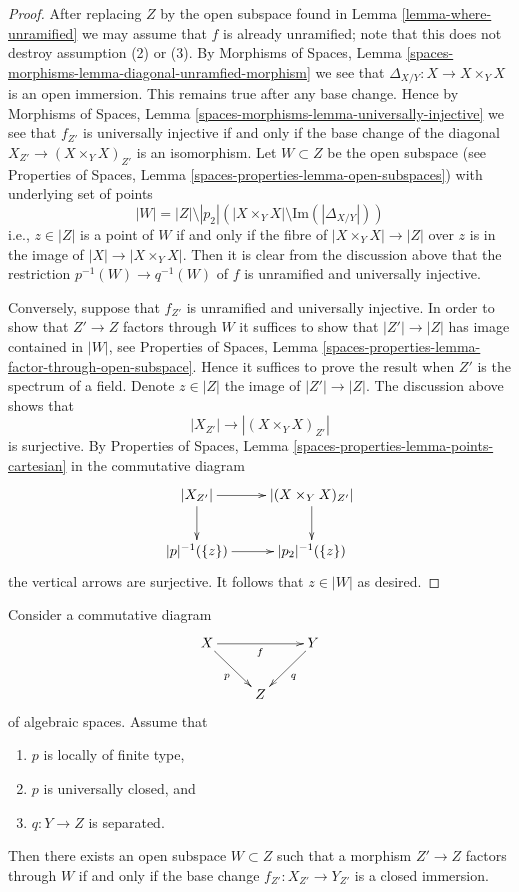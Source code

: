 \begin{proof}
After replacing $Z$ by the open subspace found in
Lemma \ref{lemma-where-unramified}
we may assume that $f$ is already unramified; note that this does not
destroy assumption (2) or (3). By
Morphisms of Spaces, Lemma
\ref{spaces-morphisms-lemma-diagonal-unramfied-morphism}
we see that $\Delta_{X/Y} : X \to X \times_Y X$ is an open immersion.
This remains true after any base change. Hence by
Morphisms of Spaces, Lemma
\ref{spaces-morphisms-lemma-universally-injective}
we see that $f_{Z'}$ is universally injective if and only if
the base change of the diagonal $X_{Z'} \to (X \times_Y X)_{Z'}$
is an isomorphism. Let $W \subset Z$ be the open subspace
(see
Properties of Spaces, Lemma
\ref{spaces-properties-lemma-open-subspaces})
with underlying set of points
$$
|W| = |Z| \setminus
|p_2|\left(|X \times_Y X| \setminus \text{Im}(|\Delta_{X/Y}|)\right)
$$
i.e., $z \in |Z|$ is a point of $W$ if and only if the fibre of
$|X \times_Y X| \to |Z|$ over $z$ is in the image of
$|X| \to |X \times_Y X|$. Then it is clear from the discussion above
that the restriction $p^{-1}(W) \to q^{-1}(W)$ of $f$ is
unramified and universally injective.

\medskip\noindent
Conversely, suppose that $f_{Z'}$ is unramified and universally injective.
In order to show that $Z' \to Z$ factors through $W$ it suffices to show
that $|Z'| \to |Z|$ has image contained in $|W|$, see
Properties of Spaces, Lemma
\ref{spaces-properties-lemma-factor-through-open-subspace}.
Hence it suffices to prove the result when $Z'$ is the spectrum of a field.
Denote $z \in |Z|$ the image of $|Z'| \to |Z|$. The discussion above shows
that
$$
|X_{Z'}| \longrightarrow |(X \times_Y X)_{Z'}|
$$
is surjective. By
Properties of Spaces, 
Lemma \ref{spaces-properties-lemma-points-cartesian}
in the commutative diagram
$$
\xymatrix{
|X_{Z'}| \ar[d] \ar[r] &
|(X \times_Y X)_{Z'}| \ar[d] \\
|p|^{-1}(\{z\}) \ar[r] &
|p_2|^{-1}(\{z\})
}
$$
the vertical arrows are surjective. It follows that $z \in |W|$ as desired.
\end{proof}

\begin{lemma}
\label{lemma-where-closed-immersion}
Consider a commutative diagram
$$
\xymatrix{
X \ar[rr]_f \ar[rd]_p & & Y \ar[ld]^q \\
& Z
}
$$
of algebraic spaces. Assume that
\begin{enumerate}
\item $p$ is locally of finite type,
\item $p$ is universally closed, and
\item $q : Y \to Z$ is separated.
\end{enumerate}
Then there exists an open subspace $W \subset Z$
such that a morphism $Z' \to Z$ factors through $W$ if and only if the
base change $f_{Z'} : X_{Z'} \to Y_{Z'}$ is a closed immersion.
\end{lemma}


